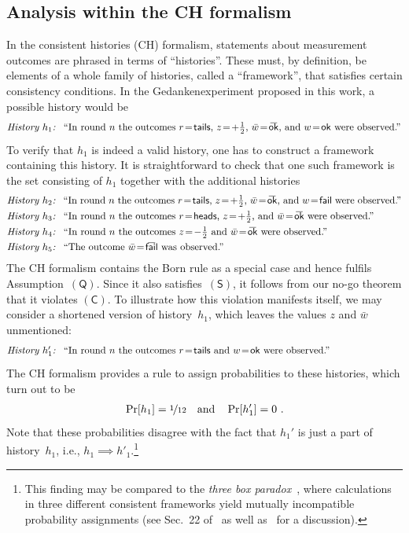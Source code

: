 \documentclass[12pt]{article}
\theoremstyle{mystyle}
\theoremstyle{definition}
\newcommand{\oline}[2]{{\mkern#2mu\overline{\protect\vphantom{t}\mkern-#2mu\smash{#1}\mkern-#2mu}\mkern#2mu}}
\newcommand*{\wb}{\bar{w}}
\newcommand*{\sminus}{{\textstyle - \frac{1}{2}}}
\newcommand*{\splus}{{\textstyle + \frac{1}{2}}}
\newcommand*{\QT}{\mathsf{(Q)}}
\newcommand*{\SW}{\mathsf{(S)}}
\newcommand*{\SelfCons}{\mathsf{(C)}}
\newcommand*{\ok}{\mathsf{ok}}
\newcommand*{\fail}{\mathsf{fail}}
\newcommand*{\okb}{\oline{\ok}{2.8}}
\newcommand*{\failb}{\oline{\fail}{5}}
\newcommand*{\head}{\mathsf{heads}}
\newcommand*{\tail}{\mathsf{tails}}
\newcommand*{\asn}[1]{``#1''}
\newcommand*{\hT}[1]{{\text{\emph{History $#1$: }}}}
\newcommand*{\sTM}[1]{\begin{minipage}{14cm} \hangindent=8.6em  #1 \end{minipage}}
\begin{document}
\subsection{Analysis within the CH formalism} \label{app_conshistories}

In the consistent histories (CH) formalism, statements about measurement outcomes are phrased in terms of ``histories''. These must, by definition, be elements of a whole family of histories, called a ``framework'', that satisfies certain consistency conditions.  In the Gedankenexperiment proposed in this work, a possible history would be
\begin{align*} 
  \sTM{\hT{h_1} \asn{In round~$n$ the outcomes $r \!=\!\tail$, $z\!=\!\splus$, $\wb\!=\!\okb$, and $w\!=\!\ok$ were observed.}}
\end{align*}
To verify that $h_1$ is indeed a valid history, one has to construct a framework containing this history. It is straightforward to check that one such framework is the set consisting of $h_1$  together with the additional histories
\begin{align*}
 \sTM{\hT{h_2} \asn{In round~$n$ the outcomes $r \!=\!\tail$, $z\!=\!\splus$, $\wb\!=\!\okb$, and $w\!=\!\fail$ were observed.}} \\
  \sTM{\hT{h_3} \asn{In round~$n$ the outcomes $r \!=\!\head$, $z\!=\!\splus$, and $\wb\!=\!\okb$ were observed.}} \\
   \sTM{\hT{h_4} \asn{In round~$n$ the outcomes $z\!=\!\sminus$ and $\wb\!=\!\okb$ were observed.}} \\
   \sTM{\hT{h_5} \asn{The outcome $\wb\!=\!\failb$ was observed.}}
\end{align*}
The CH formalism contains the Born rule as a special case and hence fulfils Assumption~$\QT$. Since it also satisfies~$\SW$, it follows from our no-go theorem that it violates $\SelfCons$. To illustrate how this violation manifests itself, we may consider a shortened version of history~$h_1$, which leaves the values $z$ and $\wb$ unmentioned:
 \begin{align*}
    \sTM{\hT{h_1' }  \asn{In round~$n$ the outcomes $r \!=\!\tail$ and  $w\!=\!\ok$ were observed.}}
 \end{align*}
The CH formalism provides a rule to assign probabilities to these histories, which turn out to be  
 \begin{align} \label{eq_probass}
  \Pr[h_1] = \nicefrac{1}{12} \quad \text{and} \quad  \Pr[h_1'] = 0 \ .
\end{align}
Note that these probabilities disagree with the fact that $h_1'$ is  just a part of history~$h_1$, i.e., $h_1 \implies h'_1$.\footnote{This finding may be compared to the  \emph{three box paradox}~\cite{AhaVai91}, where calculations in three different consistent frameworks yield mutually incompatible probability assignments (see Sec.~22 of~\cite{Griffiths02} as well as~\cite{Kent97} for a discussion).}
\end{document}
